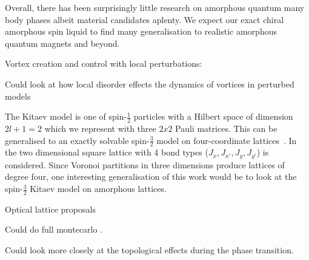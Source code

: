 Overall, there has been surprisingly little research on amorphous quantum many body phases albeit material candidates aplenty. We expect our exact chiral amorphous spin liquid to find many generalisation to realistic amorphous quantum magnets and beyond.

Vortex creation and control with local perturbations:~\autocite{jangVortexCreationControl2021}

Could look at how local disorder effects the dynamics of vortices in perturbed models~\autocite{joyDynamicsVisonsThermal2022}

The Kitaev model is one of spin-\(\tfrac{1}{2}\) particles with a Hilbert space of dimension \(2l + 1 = 2\) which we represent with three \(2x2\) Pauli matrices. This can be generalised to an exactly solvable spin-\(\tfrac{3}{2}\) model on four-coordinate lattices~\autocite{yaoAlgebraicSpinLiquid2009,wenQuantumOrderStringnet2003}. In~\autocite{yaoAlgebraicSpinLiquid2009} the two dimensional square lattice with 4 bond types (\(J_x, J_{x'},J_y, J_{y'}\)) is considered. Since Voronoi partitions in three dimensions produce lattices of degree four, one interesting generalisation of this work would be to look at the spin-\(\tfrac{3}{2}\) Kitaev model on amorphous lattices.

Optical lattice proposals~\autocite{duanControllingSpinExchange2003,micheliToolboxLatticespinModels2006}

Could do full montecarlo .

Could look more closely at the topological effects during the phase transition.
